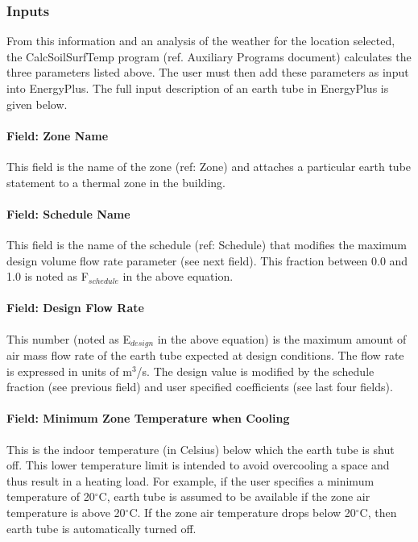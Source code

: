 \subsubsection{Inputs}
From this information and an analysis of the weather for the location selected, the CalcSoilSurfTemp program (ref. Auxiliary Programs document) calculates the three parameters listed above. The user must then add these parameters as input into EnergyPlus. The full input description of an earth tube in EnergyPlus is given below.

\paragraph{Field: Zone Name}\label{field-zone-name-5}

This field is the name of the zone (ref: Zone) and attaches a particular earth tube statement to a thermal zone in the building.

\paragraph{Field: Schedule Name}\label{field-schedule-name-6}

This field is the name of the schedule (ref: Schedule) that modifies the maximum design volume flow rate parameter (see next field). This fraction between 0.0 and 1.0 is noted as F\(_{schedule}\) in the above equation.

\paragraph{Field: Design Flow Rate}\label{field-design-flow-rate-4}

This number (noted as E\(_{design}\) in the above equation) is the maximum amount of air mass flow rate of the earth tube expected at design conditions. The flow rate is expressed in units of m\(^{3}\)/s. The design value is modified by the schedule fraction (see previous field) and user specified coefficients (see last four fields).

\paragraph{Field: Minimum Zone Temperature when Cooling}\label{field-minimum-zone-temperature-when-cooling}

This is the indoor temperature (in Celsius) below which the earth tube is shut off. This lower temperature limit is intended to avoid overcooling a space and thus result in a heating load. For example, if the user specifies a minimum temperature of 20$^\circ$C, earth tube is assumed to be available if the zone air temperature is above 20$^\circ$C. If the zone air temperature drops below 20$^\circ$C, then earth tube is automatically turned off.

